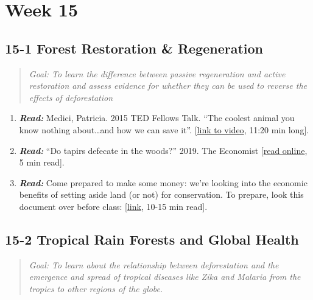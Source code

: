 \documentclass[
  10pt,
  letterpaper,
  oneside,
  open=any]{scrbook}
\begin{document}
\section{Week 15}\label{week-15}

\subsection*{15-1 Forest Restoration \&
Regeneration}\label{forest-restoration-regeneration}

\begin{quote}
\emph{Goal: To learn the difference between passive regeneration and
active restoration and assess evidence for whether they can be used to
reverse the effects of deforestation}
\end{quote}

\begin{enumerate}
\def\labelenumi{\arabic{enumi}.}
\item
  \textbf{\emph{Read:}} Medici, Patricia. 2015 TED Fellows Talk. ``The
  coolest animal you know nothing about\ldots and how we can save it''.
  {[}\href{https://www.ted.com/talks/patricia_medici_the_coolest_animal_you_know_nothing_about_and_how_we_can_save_it\#t-694653}{link
  to video}, 11:20 min long{]}.
\item
  \textbf{\emph{Read:}} ``Do tapirs defecate in the woods?'' 2019. The
  Economist
  {[}\href{https://www.economist.com/science-and-technology/2019/04/17/do-tapirs-defecate-in-the-woods}{read
  online}, 5 min read{]}.
\item
  \textbf{\emph{Read:}} Come prepared to make some money: we're looking
  into the economic benefits of setting aside land (or not) for
  conservation. To prepare, look this document over before class:
  {[}\href{https://www.tandfonline.com/doi/full/10.1080/00220485.2016.1146098}{link},
  10-15 min read{]}.
\end{enumerate}

\subsection*{15-2 Tropical Rain Forests and Global
Health}\label{tropical-rain-forests-and-global-health}

\begin{quote}
\emph{Goal: To learn about the relationship between deforestation and
the emergence and spread of tropical diseases like Zika and Malaria from
the tropics to other regions of the globe}.
\end{quote}
\end{document}
